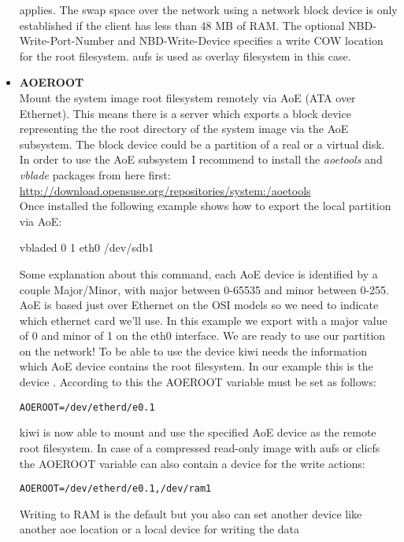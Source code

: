 \begin{itemize}
        applies. The swap space over the network using a network block device
        is only established if the client has less than 48 MB of RAM.
        The optional NBD-Write-Port-Number and NBD-Write-Device specifies
        a write COW location for the root filesystem. aufs is used as
        overlay filesystem in this case.
    \item \textbf{AOEROOT}\\
        Mount the system image root filesystem remotely via AoE
        (ATA over Ethernet). This means there is a server which
        exports a block device representing the the root directory of
        the system image via the AoE subsystem. The block device
        could be a partition of a real or a virtual disk. In order to
        use the AoE subsystem I recommend to install the \textit{aoetools}
        and \textit{vblade} packages from here first:
        \url{http://download.opensuse.org/repositories/system:/aoetools}\\
        Once installed the following example shows how to export
        the local  partition via AoE:
\begin{Command}
vbladed 0 1 eth0 /dev/sdb1
\end{Command}
        Some explanation about this command, each AoE device is identified
        by a couple Major/Minor, with major between 0-65535 and minor
        between 0-255. AoE is based just over Ethernet on the OSI models
        so we need to indicate which ethernet card we'll use. 
        In this example we export  with a major value of 0 and
        minor of 1 on the eth0 interface. We are ready to use our partition
        on the network! To be able to use the device kiwi needs the
        information which AoE device contains the root filesystem. In
        our example this is the device .
        According to this the AOEROOT variable must be set as follows:
\begin{verbatim}
AOEROOT=/dev/etherd/e0.1
\end{verbatim}
        kiwi is now able to mount and use the specified AoE device
        as the remote root filesystem. In case of a compressed read-only
        image with aufs or clicfs the AOEROOT variable can also contain
        a device for the write actions:
\begin{verbatim}
AOEROOT=/dev/etherd/e0.1,/dev/ram1
\end{verbatim}
        Writing to RAM is the default but you also can set another device
        like another aoe location or a local device for writing the data

\end{itemize}
